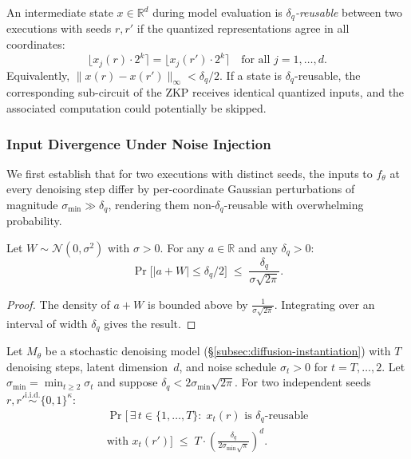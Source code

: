 \begin{definition}
\label{def:reusable-app}
An intermediate state $x \in \mathbb{R}^d$ during model evaluation is \emph{$\delta_q$-reusable} between two executions with seeds $r, r'$ if the quantized representations agree in all coordinates:
\[
    \bigl\lfloor x_{j}(r) \cdot 2^k \bigr\rceil = \bigl\lfloor x_{j}(r') \cdot 2^k \bigr\rceil \quad \text{for all } j = 1, \ldots, d.
\]
Equivalently, $\|x(r) - x(r')\|_\infty < \delta_q / 2$. If a state is $\delta_q$-reusable, the corresponding sub-circuit of the ZKP receives identical quantized inputs, and the associated computation could potentially be skipped.
\end{definition}

\subsubsection{Input Divergence Under Noise Injection}

We first establish that for two executions with distinct seeds, the inputs to $f_\theta$ at every denoising step differ by per-coordinate Gaussian perturbations of magnitude $\sigma_{\min} \gg \delta_q$, rendering them non-$\delta_q$-reusable with overwhelming probability.

\begin{lemma}
\label{lem:anti-conc-app}
Let $W \sim \mathcal{N}(0, \sigma^2)$ with $\sigma > 0$. For any $a \in \mathbb{R}$ and any $\delta_q > 0$:
\[
    \Pr\!\bigl[|a + W| \leq \delta_q/2\bigr] \;\leq\; \frac{\delta_q}{\sigma\sqrt{2\pi}}.
\]
\end{lemma}

\begin{proof}
The density of $a + W$ is bounded above by $\frac{1}{\sigma\sqrt{2\pi}}$. Integrating over an interval of width $\delta_q$ gives the result.
\end{proof}

\begin{theorem}
\label{thm:cia-theorem}
Let $M_\theta$ be a stochastic denoising model (\S\ref{subsec:diffusion-instantiation}) with $T$ denoising steps, latent dimension~$d$, and noise schedule $\sigma_t > 0$ for $t = T, \ldots, 2$. Let $\sigma_{\min} = \min_{t \geq 2} \sigma_t$ and suppose $\delta_q < 2\sigma_{\min}\sqrt{2\pi}$. For two independent seeds $r, r' \overset{\mathrm{i.i.d.}}{\sim} \{0,1\}^\kappa$:
\begin{multline*}
    \Pr\!\bigl[\,\exists\, t \in \{1, \ldots, T\} :\; x_t(r) \text{ is } \delta_q\text{-reusable} \\
    \text{with } x_t(r')\bigr] \;\leq\; T \cdot \left(\frac{\delta_q}{2\sigma_{\min}\sqrt{\pi}}\right)^{\!d}.
\end{multline*}
\end{theorem}

